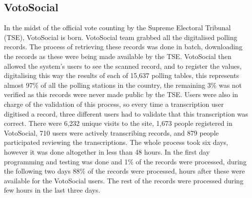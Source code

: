 \documentclass[letterpaper,10pt]{article}
\begin{document}
\subsection{VotoSocial}

In the midst of the official vote counting by the Supreme Electoral Tribunal (TSE), VotoSocial is born. VotoSocial team grabbed all the digitalised polling records. The process of retrieving these records was done in batch, downloading the records as these were being made available by the TSE. VotoSocial then allowed the system's users to see the scanned record, and to register the values, digitalising this way the results of each of 15,637 polling tables, this represents almost 97\% of all the polling stations in the country, the remaining 3\% was not verified as this records were never made public by the TSE. Users were also in charge of the validation of this process, so every time a transcription user digitised a record, three different users had to validate that this transcription was correct. There were 6,232 unique visits to the site, 1,673 people registered in VotoSocial, 710 users were actively transcribing records, and 879 people participated reviewing the transcriptions. The whole process took six days, however it was done altogether in less than 48 hours. In the first day programming and testing was done and 1\% of the records were processed, during the following two days 88\% of the records were processed, hours after these were available for the VotoSocial users. The rest of the records were processed during few hours in the last three days.
\end{document}
